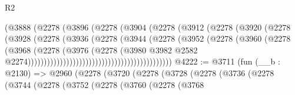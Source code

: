 \begin{lexlean}{R2}
\begin{coremodule}
                                            (@3888
                                              (@2278
                                                (@3896
                                                  (@2278
                                                    (@3904
                                                      (@2278
                                                        (@3912
                                                          (@2278
                                                            (@3920
                                                              (@2278
                                                                (@3928
                                                                  (@2278
                                                                    (@3936
                                                                      (@2278
                                                                        (@3944
                                                                          (@2278
                                                                            (@3952
                                                                              (@2278
                                                                                (@3960
                                                                                  (@2278
                                                                                    (@3968
                                                                                      (@2278
                                                                                        (@3976
                                                                                          (@2278
                                                                                            (@3980
                                                                                              @3982
                                                                                              @2582
                                                                                              @2274)))))))))))))))))))))))))))))))))))))))))))))
@4222 := @3711
    (fun (__b : @2130) =>
    @2960
      (@2278
        (@3720
          (@2278
            (@3728
              (@2278
                (@3736
                  (@2278
                    (@3744
                      (@2278
                        (@3752
                          (@2278
                            (@3760
                              (@2278
                                (@3768

\end{coremodule}
\end{lexlean}
